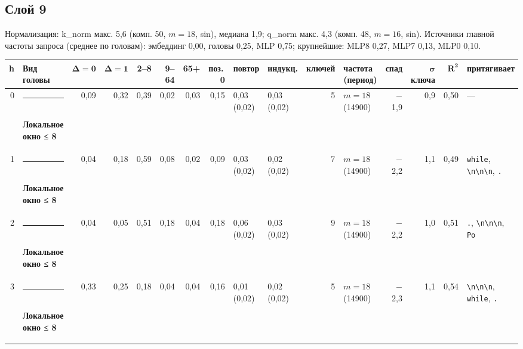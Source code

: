 \documentclass[10pt]{article}
\begin{document}
\par\vspace{0.4em}
\noindent\begin{minipage}{\linewidth}
\subsection*{Слой 9}
{\small\color{ink2} Нормализация: k\_norm макс. 5,6 (комп. 50, $m{=}18$, sin), медиана 1,9; q\_norm макс. 4,3 (комп. 48, $m{=}16$, sin). Источники главной частоты запроса (среднее по головам): эмбеддинг 0,00, головы 0,25, MLP 0,75; крупнейшие: MLP8 0,27, MLP7 0,13, MLP0 0,10.}
\begin{center}{\footnotesize\begin{tabular}{|r|l|r|r|r|r|r|r|l|l|r|l|r|r|r|l|}
\hline
\rowcolor{head}\textbf{h} & \textbf{Вид головы} & $\boldsymbol{\Delta{=}0}$ & $\boldsymbol{\Delta{=}1}$ & \textbf{2–8} & \textbf{9–64} & \textbf{65+} & \textbf{поз.\,0} & \textbf{повтор} & \textbf{индукц.} & \textbf{ключей} & \textbf{частота (период)} & \textbf{спад} & $\boldsymbol{\sigma}$ \textbf{ключа} & $\boldsymbol{R^2}$ & \textbf{притягивает} \\ \hline
0 & \textcolor[HTML]{1BAF7A}{\rule{0.62em}{0.62em}}\,\textbf{Локальное окно ≤ 8} & 0,09 & 0,32 & 0,39 & 0,02 & 0,03 & 0,15 & 0,03 (0,02) & 0,03 (0,02) & 5 & $m{=}18$ (14900) & $-$1,9 & 0,9 & 0,50 & — \\ \hline
1 & \textcolor[HTML]{1BAF7A}{\rule{0.62em}{0.62em}}\,\textbf{Локальное окно ≤ 8} & 0,04 & 0,18 & 0,59 & 0,08 & 0,02 & 0,09 & 0,03 (0,02) & 0,02 (0,02) & 7 & $m{=}18$ (14900) & $-$2,2 & 1,1 & 0,49 & \texttt{\textvisiblespace{}while}, \texttt{\textvisiblespace{}\textbackslash{}n\textbackslash{}n\textbackslash{}n}, \texttt{\textvisiblespace{}.} \\ \hline
2 & \textcolor[HTML]{1BAF7A}{\rule{0.62em}{0.62em}}\,\textbf{Локальное окно ≤ 8} & 0,04 & 0,05 & 0,51 & 0,18 & 0,04 & 0,18 & 0,06 (0,02) & 0,03 (0,02) & 9 & $m{=}18$ (14900) & $-$2,2 & 1,0 & 0,51 & \texttt{\textvisiblespace{}.}, \texttt{\textvisiblespace{}\textbackslash{}n\textbackslash{}n\textbackslash{}n}, \texttt{\textvisiblespace{}Po} \\ \hline
3 & \textcolor[HTML]{1BAF7A}{\rule{0.62em}{0.62em}}\,\textbf{Локальное окно ≤ 8} & 0,33 & 0,25 & 0,18 & 0,04 & 0,04 & 0,16 & 0,01 (0,02) & 0,02 (0,02) & 5 & $m{=}18$ (14900) & $-$2,3 & 1,1 & 0,54 & \texttt{\textvisiblespace{}\textbackslash{}n\textbackslash{}n\textbackslash{}n}, \texttt{\textvisiblespace{}while}, \texttt{\textvisiblespace{}.} \\ \hline

\end{tabular}}
\end{center}
\end{minipage}
\end{document}
